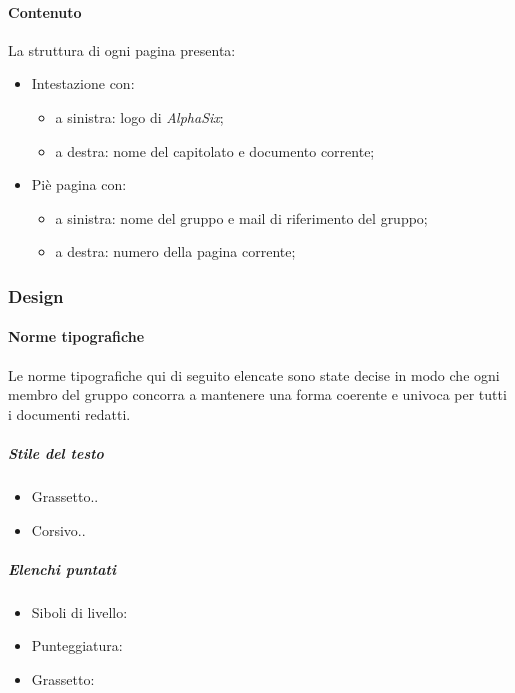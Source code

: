 			\paragraph{Contenuto}\label{PS:Documentazione:Struttura:Contenuto}
			La struttura di ogni pagina presenta:
			\begin{itemize}
				\item Intestazione con:
				\begin{itemize}
					\item a sinistra: logo di \textit{AlphaSix};
					\item a destra: nome del capitolato e documento corrente;		
				\end{itemize}
				 \item Piè pagina con:
				 \begin{itemize}
				 	\item a sinistra: nome del gruppo e mail di riferimento del gruppo;
				 	\item a destra: numero della pagina corrente;
				\end{itemize}	
			\end{itemize}
	
	
		\subsubsection{Design}\label{PS:Documentazione:Design}
		
			\paragraph{Norme tipografiche}\label{PS:Documentazione:Design:NormeT}
			Le norme tipografiche qui di seguito elencate sono state decise in modo che ogni membro del gruppo concorra a mantenere una forma coerente e univoca per tutti i documenti redatti.
			
			\subparagraph{Stile del testo}\label{PS:Documentazione:Design:NormeT:StileTesto}
			\begin{itemize}
				\item Grassetto..
				\item Corsivo..
			\end{itemize}
		
			\subparagraph{Elenchi puntati}\label{PS:Documentazione:Design:NormeT:ElenchiPuntati}
			\begin{itemize}
				\item Siboli di livello:
				\item Punteggiatura:
				\item Grassetto:
			\end{itemize}
		
